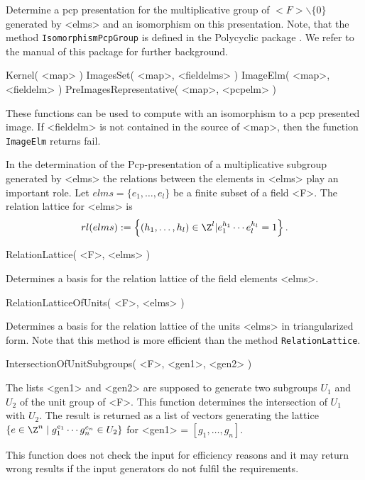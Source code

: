 Determine a pcp presentation for the multiplicative group of
$<F>\backslash\{0\}$ generated by
<elms> and an isomorphism on this presentation. 
Note, that the method {\tt IsomorphismPcpGroup} is defined in the
Polycyclic package \cite{Polycyclic}. We refer to the manual of this
package for further background. 


\> Kernel( <map> )
\> ImagesSet( <map>, <fieldelms> ) 
\> ImageElm( <map>, <fieldelm> )
\> PreImagesRepresentative( <map>, <pcpelm> )

These functions can be used to compute with an isomorphism to a pcp
presented image. If <fieldelm> is not contained in the source of
<map>,
then the function {\tt ImageElm} returns fail.

In the determination of the Pcp-presentation of a multiplicative
subgroup generated by <elms> the relations between the elements in
<elms> play an important role.
Let $elms=\{e_1,\dots,e_l\}$ be a finite subset of a field <F>.
The relation lattice for <elms> is 
$$
rl(elms):=\left\{(h_1,\dots,h_l) \in \Z^l | e_1^{h_1} \cdots
e_l^{h_l} = 1\right\} .
$$

\> RelationLattice( <F>, <elms> )

Determines a basis for the relation lattice of the field elements <elms>.
 


\> RelationLatticeOfUnits( <F>, <elms> )

Determines a basis for the relation lattice of the units <elms> in 
triangularized form. Note that this method is more efficient than 
the method {\tt RelationLattice}.

\> IntersectionOfUnitSubgroups( <F>, <gen1>, <gen2> )

The lists <gen1> and <gen2> are supposed to generate two subgroups 
$U_1$ and $U_2$ of the unit group of <F>. This function determines 
the intersection of $U_1$ with $U_2$. The result is returned as a 
list of vectors generating the lattice $\{ e \in \Z^n \mid g_1^{e_1} 
\cdots g_n^{e_n} \in U_2 \}$ for <gen1> = $[g_1, \ldots, g_n]$.

This function does not check the input for efficiency reasons and it 
may return wrong results if the input generators do not fulfil the 
requirements.


